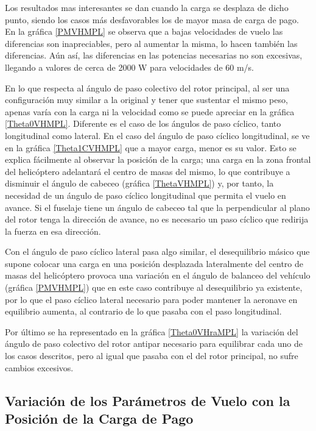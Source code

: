 Los resultados mas interesantes se dan cuando la carga se desplaza de dicho punto, siendo los casos más desfavorables los de mayor masa de carga de pago. En la gráfica \ref{PMVHMPL} se observa que a bajas velocidades de vuelo las diferencias son inapreciables, pero al aumentar la misma, lo hacen también las diferencias. Aún así, las diferencias en las potencias necesarias no son excesivas, llegando a valores de cerca de 2000 W para velocidades de 60 m/s.

En lo que respecta al ángulo de paso colectivo del rotor principal, al ser una configuración muy similar a la original y tener que sustentar el mismo peso, apenas varía con la carga ni la velocidad como se puede apreciar en la gráfica \ref{Theta0VHMPL}. Diferente es el caso de los ángulos de paso cíclico, tanto longitudinal como lateral. En el caso del ángulo de paso cíclico longitudinal, se ve en la gráfica \ref{Theta1CVHMPL} que a mayor carga, menor es su valor. Esto se explica fácilmente al observar la posición de la carga; una carga en la zona frontal del helicóptero adelantará el centro de masas del mismo, lo que contribuye a disminuir el ángulo de cabeceo (gráfica \ref{ThetaVHMPL}) y, por tanto, la necesidad de un ángulo de paso cíclico longitudinal que permita el vuelo en avance. Si el fuselaje tiene un ángulo de cabeceo tal que la perpendicular al plano del rotor tenga la dirección de avance, no es necesario un paso cíclico que redirija la fuerza en esa dirección.

Con el ángulo de paso cíclico lateral pasa algo similar, el desequilibrio másico que supone colocar una carga en una posición desplazada lateralmente del centro de masas del helicóptero provoca una variación en el ángulo de balanceo del vehículo (gráfica \ref{PMVHMPL}) que en este caso contribuye al desequilibrio ya existente, por lo que el paso cíclico lateral necesario para poder mantener la aeronave en equilibrio aumenta, al contrario de lo que pasaba con el paso longitudinal.

Por último se ha representado en la gráfica \ref{Theta0VHraMPL} la variación del ángulo de paso colectivo del rotor antipar necesario para equilibrar cada uno de los casos descritos, pero al igual que pasaba con el del rotor principal, no sufre cambios excesivos.

\subsection*{Variación de los Parámetros de Vuelo con la Posición de la Carga de Pago}

